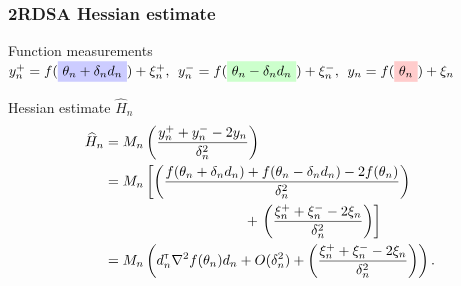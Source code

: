 \begin{frame}
\begin{small}
\frametitle{\centering 2RDSA Hessian estimate}
\begin{block}{Function measurements}
$y_{n}^+ = f(\tikz[baseline]{\node[fill=blue!20,anchor=base] (tL) {$\theta_n+\delta_n d_n$};}) + \xi_{n}^+,\hspace{.16cm} y_{n}^- = f(\tikz[baseline]{\node[fill=green!20,anchor=base] (tL1) {$\theta_n-\delta_n d_n$};}) + \xi_{n}^-,\hspace{.16cm} y_{n} = f(\tikz[baseline]{\node[fill=red!20,anchor=base] (tL2) {$\theta_n$};}) + \xi_{n}$
\end{block}
\pause
\begin{block}{Hessian estimate $\widehat H_n$} 
\begin{align}
\widehat H_n & = M_n \left(\dfrac{y_n^+ + y_n^- - 2 y_n}{\delta_n^2}\right) \nonumber \\
& =  M_n \left[\left(\dfrac{f(\theta_n+\delta_n d_n) + f(\theta_n-\delta_n d_n) - 2 f(\theta_n)}{\delta_n^2}\right) \right.\nonumber \\&\hspace{10em}+\left. \left(\dfrac{\xi_n^+ + \xi_n^- - 2 \xi_n}{\delta_n^2}\right)\right] \nonumber \\
& = M_n \left(d_n\tr \nabla^2 f(\theta_n) d_n +  O(\delta_n^2) + \left(\dfrac{\xi_n^+ + \xi_n^- - 2 \xi_n}{\delta_n^2} \right)\right).\label{eq:h0}
\end{align}
\end{block}
\end{small}
\end{frame}


